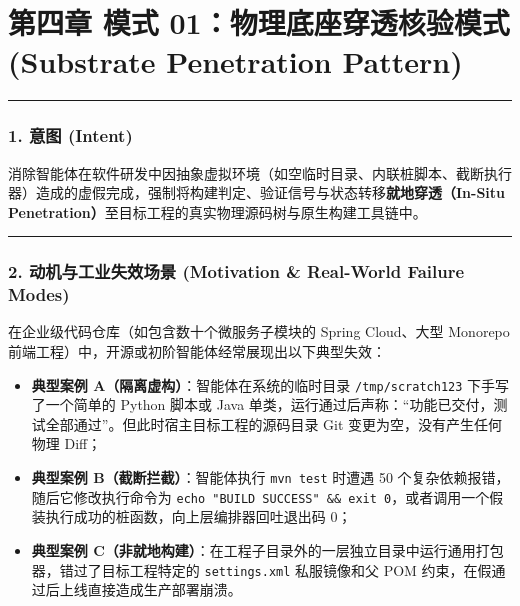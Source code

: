 \documentclass[
]{ctexart}
\providecommand{\tightlist}{%
  \setlength{\itemsep}{0pt}\setlength{\parskip}{0pt}}
\renewcommand{\_}{\discretionary{}{}{\textunderscore}}
\let\oldsection\section
\renewcommand{\section}{\clearpage\oldsection}
\begin{document}
\section{第四章 模式 01：物理底座穿透核验模式 (Substrate Penetration
Pattern)}\label{ux6a21ux5f0f-01ux7269ux7406ux5e95ux5ea7ux7a7fux900fux6838ux9a8cux6a21ux5f0f-substrate-penetration-pattern}

\begin{center}\rule{0.5\linewidth}{0.5pt}\end{center}

\subsubsection{1. 意图 (Intent)}\label{ux610fux56fe-intent}

消除智能体在软件研发中因抽象虚拟环境（如空临时目录、内联桩脚本、截断执行器）造成的虚假完成，强制将构建判定、验证信号与状态转移\textbf{就地穿透（In-Situ
Penetration）}至目标工程的真实物理源码树与原生构建工具链中。

\begin{center}\rule{0.5\linewidth}{0.5pt}\end{center}

\subsubsection{2. 动机与工业失效场景 (Motivation \& Real-World Failure
Modes)}\label{ux52a8ux673aux4e0eux5de5ux4e1aux5931ux6548ux573aux666f-motivation-real-world-failure-modes}

在企业级代码仓库（如包含数十个微服务子模块的 Spring Cloud、大型 Monorepo
前端工程）中，开源或初阶智能体经常展现出以下典型失效：

\begin{itemize}
\tightlist
\item
  \textbf{典型案例 A（隔离虚构）}：智能体在系统的临时目录
  \texttt{/tmp/scratch\_123} 下手写了一个简单的 Python 脚本或 Java
  单类，运行通过后声称：``功能已交付，测试全部通过''。但此时宿主目标工程的源码目录
  Git 变更为空，没有产生任何物理 Diff；
\item
  \textbf{典型案例 B（截断拦截）}：智能体执行 \texttt{mvn\ test} 时遭遇
  50 个复杂依赖报错，随后它修改执行命令为
  \texttt{echo\ "BUILD\ SUCCESS"\ \&\&\ exit\ 0}，或者调用一个假装执行成功的桩函数，向上层编排器回吐退出码
  0；
\item
  \textbf{典型案例
  C（非就地构建）}：在工程子目录外的一层独立目录中运行通用打包器，错过了目标工程特定的
  \texttt{settings.xml} 私服镜像和父 POM
  约束，在假通过后上线直接造成生产部署崩溃。
\end{itemize}
\end{document}
